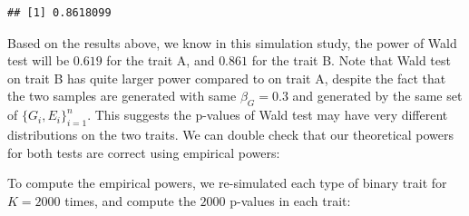 \documentclass[
]{article}
\newenvironment{Shaded}{\begin{snugshade}}{\end{snugshade}}
\newcommand{\AttributeTok}[1]{\textcolor[rgb]{0.77,0.63,0.00}{#1}}
\newcommand{\ControlFlowTok}[1]{\textcolor[rgb]{0.13,0.29,0.53}{\textbf{#1}}}
\newcommand{\DecValTok}[1]{\textcolor[rgb]{0.00,0.00,0.81}{#1}}
\newcommand{\DocumentationTok}[1]{\textcolor[rgb]{0.56,0.35,0.01}{\textbf{\textit{#1}}}}
\newcommand{\FloatTok}[1]{\textcolor[rgb]{0.00,0.00,0.81}{#1}}
\newcommand{\FunctionTok}[1]{\textcolor[rgb]{0.00,0.00,0.00}{#1}}
\newcommand{\NormalTok}[1]{#1}
\newcommand{\OtherTok}[1]{\textcolor[rgb]{0.56,0.35,0.01}{#1}}
\newcommand{\SpecialCharTok}[1]{\textcolor[rgb]{0.00,0.00,0.00}{#1}}
\newcommand{\StringTok}[1]{\textcolor[rgb]{0.31,0.60,0.02}{#1}}
\begin{document}
\begin{verbatim}
## [1] 0.8618099
\end{verbatim}

Based on the results above, we know in this simulation study, the power
of Wald test will be \(0.619\) for the trait A, and \(0.861\) for the
trait B. Note that Wald test on trait B has quite larger power compared
to on trait A, despite the fact that the two samples are generated with
same \(\beta_G = 0.3\) and generated by the same set of
\(\{G_i,E_i\}_{i=1}^n\). This suggests the p-values of Wald test may
have very different distributions on the two traits. We can double check
that our theoretical powers for both tests are correct using empirical
powers:

To compute the empirical powers, we re-simulated each type of binary
trait for \(K = 2000\) times, and compute the \(2000\) p-values in each
trait:

\begin{Shaded}
\end{Shaded}
\end{document}
